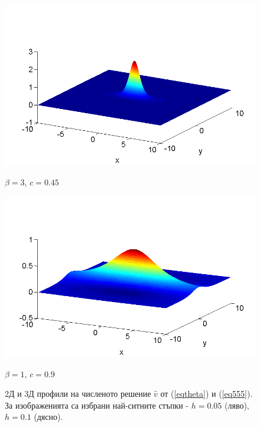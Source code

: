 \documentclass[a4paper]{article}
\newcommand{\rf}[1]{(\ref{#1})}
\theoremstyle{remark}
\begin{document}
\begin{figure}[ht]
\begin{minipage}[b]{0.5\linewidth}
		\includegraphics[width=\linewidth]{SolutionView/ChristovIC_30_bt3_c045_prpview.png}		
		\centerline{$\beta = 3$, $c = 0.45$ }
	\end{minipage}
	\begin{minipage}[b]{0.5\linewidth}
		 \raggedright
		\includegraphics[width=\linewidth]{SolutionView/ChristovIC_128_bt1_c090_prpview.png}
		\centerline{$\beta = 1$, $c = 0.9$}
	\end{minipage}
	\caption{2Д и 3Д профили на численото решение $\widehat v$ от \rf{eqtheta} и \rf{eq555}. За изображенията са избрани най-ситните стъпки - $h=0.05$ (ляво), $h=0.1$ (дясно).}
	\label{fig:solutions}
\end{figure}
\FloatBarrier
\end{document}
